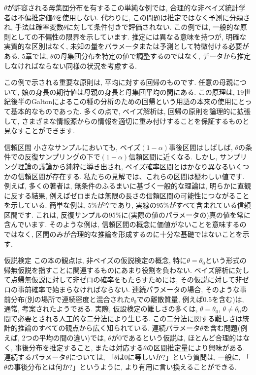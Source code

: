 \documentclass[10pt,dvipdfmx,a4]{beamer}
\begin{document}

\begin{frame}
$\theta$が許容される母集団分布を有するこの単純な例では, 合理的な非ベイズ統計学者は不偏推定値$\theta$を使用しない.
代わりに, この問題は推定ではなく予測に分類され, 手法は確率変数$\theta$に対して条件付きで評価されない.
この例では, 一般的な原則としての不偏性の限界を示しています.
推定には異なる意味を持つが, 明確な実質的な区別はなく, 未知の量をパラメータまたは予測として特徴付ける必要がある.
5章では, $\theta$の母集団分布を特定の値で調整するのではなく, データから推定しなければならない同様の状況を考慮する.

この例で示される重要な原則は, 平均に対する回帰のものです.
任意の母親について, 娘の身長の期待値は母親の身長と母集団平均の間にある.
この原理は, 19世紀後半のGaltonによるこの種の分析のための回帰という用語の本来の使用にとって基本的なものであった.
多くの点で, ベイズ解析は, 回帰の原則を論理的に拡張して, さまざまな情報源からの情報を適切に重み付けすることを保証するものと見なすことができます.
\end{frame}


\begin{frame}{信頼区間}
小さなサンプルにおいても, ベイズ$(1-\alpha)$事後区間はしばしば, $\theta$の条件での反復サンプリングの下で$(1-\alpha)$信頼区間に近くなる.
しかし, サンプリング理論の議論から純粋に導き出され, ベイズ確率区間とはかなり異なるいくつかの信頼区間が存在する.
私たちの見解では、これらの区間は疑わしい値です.
例えば, 多くの著者は, 無条件のふるまいに基づく一般的な理論は, 明らかに直観に反する結果, 例えばゼロまたは無限の長さの信頼区間の可能性につながることを示している.
簡単な例は, 5\%が空であり, 実線の95\%がすべて含まれている信頼区間です.
これは, 反復サンプルの95\%に(実際の値のパラメータの)真の値を常に含んでいます.
そのような例は, 信頼区間の概念に価値がないことを意味するのではなく, 区間のみが合理的な推論を形成するのに十分な基礎ではないことを示す.
\end{frame}


\begin{frame}{仮説検定}
この本の観点は, 非ベイズの仮説検定の概念, 特に$\theta=\theta_0$という形式の帰無仮説を指すことに関連するものにあまり役割を負わない.
ベイズ解析に対して点帰無仮説に対して非ゼロの確率をもたらすためには, その仮説に対して非ゼロの事前確率で始まらなければならない.
連続パラメータの場合, そのような事前分布(別の場所で連続密度と混合された$\theta_0$での離散質量, 例えば0.5を含む)は, 通常, 考案されたようである.
実際, 仮設検定の難しさの多くは, $\theta=\theta_0$, $\theta\neq \theta_0$の間で必要とされる人工的な二分法により生じる.
この二分法に関する難しさは統計的推論のすべての観点から広く知られている.
連続パラメータ$\theta$を含む問題(例えば, 2つの平均の間の違い)では, $\theta$が0であるという仮説は, ほとんど合理的はなく, 事後分布を推定すること, または対応する$\theta$の区間推定量により興味がある.
連続するパラメータ$\theta$については, 「$\theta$は0に等しいか?」という質問は, 一般に, 「$\theta$の事後分布とは何か?」というように, より有用に言い換えることができる.
\end{frame}
\end{document}
